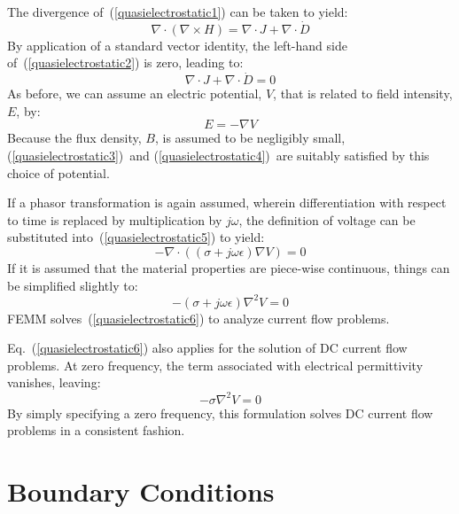 \documentclass[12pt]{report}
\begin{document}
The divergence of~(\ref{quasielectrostatic1}) can be taken to yield:
\begin{equation} \label{quasielectrostatic2}
\nabla \cdot \left( \nabla \times H \right) = \nabla \cdot J + \nabla \cdot \dot{D}
\end{equation}
By application of a standard vector identity, the left-hand side 
of~(\ref{quasielectrostatic2})
is zero, leading to:
\begin{equation} \label{quasielectrostatic5}
\nabla \cdot J + \nabla \cdot \dot{D} = 0
\end{equation}
As before, we can assume an electric potential, $V$, that is related to field intensity,
$E$, by:
\begin{equation}
E = -\nabla V
\end{equation}
Because the flux density, $B$, is assumed to be negligibly small, (\ref{quasielectrostatic3})~and
(\ref{quasielectrostatic4})~are suitably satisfied by this choice of potential.

If a phasor transformation is again assumed, wherein differentiation with respect to time
is replaced by multiplication by $j \omega$, the definition of voltage can be substituted
into~(\ref{quasielectrostatic5}) to yield:
\begin{equation}
- \nabla \cdot \left( \left( \sigma + j \omega \epsilon \right) \nabla V \right) = 0
\end{equation}
If it is assumed that the material properties are piece-wise continuous, things can be
simplified slightly to:
\begin{equation}
\label{quasielectrostatic6}
- \left( \sigma + j \omega \epsilon \right) \nabla^2 V = 0
\end{equation}
FEMM solves~(\ref{quasielectrostatic6}) to analyze current flow problems.

Eq.~(\ref{quasielectrostatic6}) also applies for the solution of DC current flow problems.
At zero frequency, the term associated with electrical permittivity vanishes, leaving:
\begin{equation}
\label{quasielectrostatic7}
- \sigma \nabla^2 V = 0
\end{equation}
By simply specifying a zero frequency, this formulation solves DC current flow problems
in a consistent fashion.


\section{Boundary Conditions} \label{bcsection}
\end{document}
